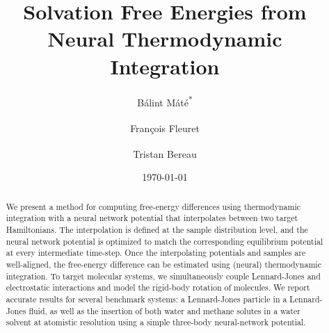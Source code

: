 \documentclass[%
onecolumn,
superscriptaddress,
nofootinbib,
amsmath,amssymb,
table
]{revtex4-2}
\date{\today}
\renewcommand{\thefootnote}{\fnsymbol{footnote}}
\begin{document}

\newcommand{\marker}[3]{
  \tikz[baseline=(X.base)]{
    \node [fill=#1!40,rounded corners] (X) {#2:};
  }
  {\color{#1!80!black}#3}
}

\newcommand{\tb}[1]{\marker{blue}{TB}{#1}}  %



\title{Solvation Free Energies from Neural Thermodynamic Integration}%





\author{Bálint Máté\textsuperscript{*}}
\author{François Fleuret\textsuperscript{\dag}}%
\author{Tristan Bereau\textsuperscript{\ddag}}%



\begin{abstract}
We present a method for computing free-energy differences using thermodynamic integration with a neural network potential that interpolates between two target Hamiltonians. The interpolation is defined at the sample distribution level, and the neural network potential is optimized to match the corresponding equilibrium potential at every intermediate time-step. Once the interpolating potentials and samples are well-aligned, the free-energy difference can be estimated using (neural) thermodynamic integration. To target molecular systems, we simultaneously couple Lennard-Jones and electrostatic interactions and  model the rigid-body rotation of molecules.  We report accurate results for several benchmark systems: a Lennard-Jones particle in a Lennard-Jones fluid, as well as the insertion of both water and methane solutes in a water solvent at atomistic resolution using a simple three-body neural-network potential.

\end{abstract}

\maketitle
\def\thefootnote{*}
\def\thefootnote{\dag}
\def\thefootnote{\ddag}
\end{document}
